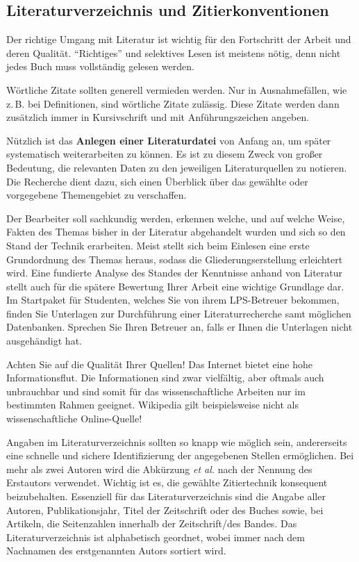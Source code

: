 \subsection{Literaturverzeichnis und Zitierkonventionen}
\label{sub:Literaturverzeichnis und Zitierkonventionen}

Der richtige Umgang mit Literatur ist wichtig für den Fortschritt der Arbeit und deren Qualität. "`Richtiges"' und selektives Lesen ist meistens nötig, denn nicht jedes Buch muss vollständig gelesen werden.

Wörtliche Zitate sollten generell vermieden werden. Nur in Ausnahmefällen, wie z.\,B. bei Definitionen, sind wörtliche Zitate zulässig. Diese Zitate werden dann zusätzlich immer in Kursivschrift und mit Anführungszeichen angeben.

Nützlich ist das \textbf{Anlegen einer Literaturdatei} von Anfang an, um später systematisch weiterarbeiten zu können. Es ist zu diesem Zweck von großer Bedeutung, die relevanten Daten zu den jeweiligen Literaturquellen zu notieren.
Die Recherche dient dazu, sich einen Überblick über das gewählte oder vorgegebene Themengebiet zu verschaffen.

Der Bearbeiter soll sachkundig werden, erkennen welche, und auf welche Weise, Fakten des Themas bisher in der Literatur abgehandelt wurden und sich so den Stand der Technik erarbeiten. Meist stellt sich beim Einlesen eine erste Grundordnung des Themas heraus, sodass die Gliederungserstellung erleichtert wird. Eine fundierte Analyse des Standes der Kenntnisse anhand von Literatur stellt auch für die spätere Bewertung Ihrer Arbeit eine wichtige Grundlage dar. Im Startpaket für Studenten, welches Sie von ihrem LPS-Betreuer bekommen, finden Sie Unterlagen zur Durchführung einer Literaturrecherche samt möglichen Datenbanken. Sprechen Sie Ihren Betreuer an, falls er Ihnen die Unterlagen nicht ausgehändigt hat.

Achten Sie auf die Qualität Ihrer Quellen! Das Internet bietet eine hohe Informationsflut. Die Informationen sind zwar vielfältig, aber oftmals auch unbrauchbar und sind somit für das wissenschaftliche Arbeiten nur im bestimmten Rahmen geeignet. Wikipedia gilt beispielsweise nicht als wissenschaftliche Online-Quelle!

Angaben im Literaturverzeichnis sollten so knapp wie möglich sein, andererseits eine schnelle und sichere Identifizierung der angegebenen Stellen ermöglichen.
Bei mehr als zwei Autoren wird die Abkürzung \emph{et al.} nach der Nennung des Erstautors verwendet. Wichtig ist es, die gewählte Zitiertechnik konsequent beizubehalten.
Essenziell für das Literaturverzeichnis sind die Angabe aller Autoren, Publikationsjahr, Titel der Zeitschrift oder des Buches sowie, bei Artikeln, die Seitenzahlen innerhalb der Zeitschrift/des Bandes.
Das Literaturverzeichnis ist alphabetisch geordnet, wobei immer nach dem Nachnamen des erstgenannten Autors sortiert wird.

